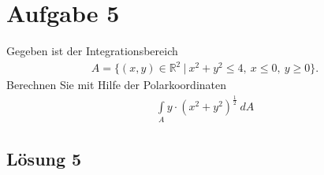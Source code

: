 \documentclass[main.tex]{subfiles}
\begin{document}
\section{Aufgabe 5}
Gegeben ist der Integrationsbereich 
\begin{align*}
    A = \{ (x, y) \in \mathbb{R}^2 \ | \ x^2 + y^2 \leq 4, \ x \leq 0, \ y \geq 0 \}.
\end{align*}
Berechnen Sie mit Hilfe der Polarkoordinaten
\begin{align*}
    \int \limits_{A} y \cdot (x^2 + y^2)^{\frac{1}{2}} \ dA
\end{align*} 

\subsection{Lösung 5}
\end{document}
